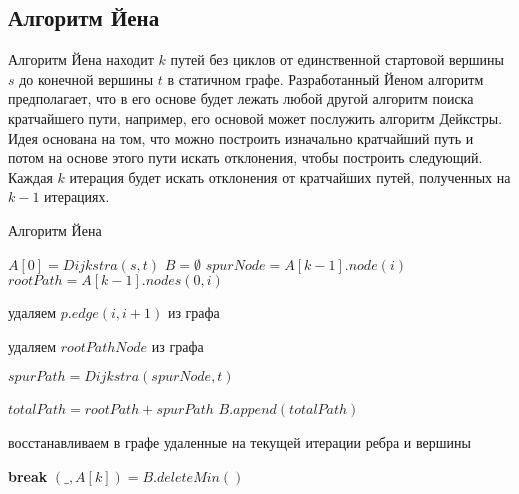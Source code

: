 \subsection{Алгоритм Йена}
Алгоритм Йена находит $k$ путей без циклов от единственной стартовой вершины $s$ до конечной вершины $t$ в статичном графе. Разработанный Йеном алгоритм предполагает, что в его основе будет лежать любой другой алгоритм поиска кратчайшего пути, например, его основой может послужить алгоритм Дейкстры. Идея основана на том, что можно построить изначально кратчайший путь и потом на основе этого пути искать отклонения, чтобы построить следующий. Каждая $k$ итерация будет искать отклонения от кратчайших путей, полученных на $k-1$ итерациях.
\begin{algorithm}[!h]
	\caption{Алгоритм Йена}\label{lst2}
	\begin{algorithmic}
		\State $A[0] = Dijkstra(s, t)$ 
		\State $B = \emptyset$ 
			\For{$i = 0$ to $size(A[k-1]) - 1] $}
				\State $spurNode = A[k-1].node(i)$ 
				\State $rootPath = A[k-1].nodes(0, i)$ 
				
						\State удаляем $p.edge(i, i+1)$ из графа
					\EndIf
				\EndFor
				
						\State удаляем $rootPathNode$ из графа
					\EndIf
				\EndFor
				
				\State $spurPath = Dijkstra(spurNode, t)$ 
				
				\State $totalPath = rootPath + spurPath$ 
				\State $B.append(totalPath)$ 
				
				\State восстанавливаем в графе удаленные на текущей итерации ребра и вершины
			\EndFor
			
				\State \textbf{break}
			\EndIf
			\State $(\_, A[k]) = B.deleteMin()$
		\EndFor
		\EndFunction
	\end{algorithmic}
\end{algorithm}
\FloatBarrier

\chapterconclusion